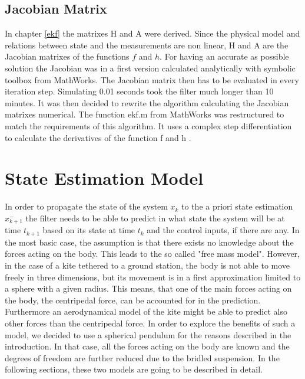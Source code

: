 \subsection*{Jacobian Matrix}
In chapter \ref{ekf} the matrixes H and A were derived. Since the physical model and relations between state and the measurements are non linear, H and A are the Jacobian matrixes of the functions $f$ and $h$. For having an accurate as possible solution the Jacobian was in a first version calculated analytically with symbolic toolbox from MathWorks. The Jacobian matrix then has to be evaluated in every iteration step. Simulating 0.01 seconds took the filter much longer than 10 minutes. It was then decided to rewrite the algorithm calculating the Jacobian matrixes numerical. The function ekf.m \cite{mcekf} from MathWorks was restructured to match the requirements of this algorithm. It uses a complex step differentiation to calculate the derivatives of the function f and h \cite{diehl11}. 


\section{State Estimation Model}\label{state_estimation}
In order to propagate the state of the system $x_{k}$ to the a priori state estimation $x^{-}_{k+1}$ the filter needs to be able to predict in what state the system will be at time $t_{k+1}$ based on its state at time $t_{k}$ and the control inputs, if there are any. In the most basic case, the assumption is that there exists no knowledge about the forces acting on the body. This leads to the so called "free mass model". However, in the case of a kite tethered to a ground station, the body is not able to move freely in three dimensions, but its movement is in a first approximation limited to a sphere with a given radius. This means, that one of the main forces acting on the body, the centripedal force, can be accounted for in the prediction. Furthermore an aerodynamical model of the kite might be able to predict also other forces than the centripedal force. In order to explore the benefits of such a model, we decided to use a spherical pendulum for the reasons described in the introduction. In that case, all the forces acting on the body are known and the degrees of freedom are further reduced due to the bridled suspension. In the following sections, these two models are going to be described in detail. 

